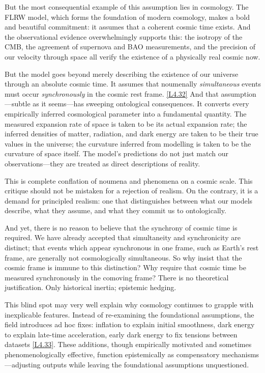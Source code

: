 \documentclass[12pt]{book}
\newcounter{logicanchor}
\newenvironment{logicanchorenv}[1]{\refstepcounter{logicanchor}\label{#1}}{}
\newcommand{\logiclink}[2]{\begin{logicanchorenv}{logic:#1}\end{logicanchorenv}\hyperref[appendix:#1]{[#1]}\xspace}
\begin{document}
But the most consequential example of this assumption lies in cosmology. The FLRW model, which forms the foundation of modern cosmology, makes a bold and beautiful commitment: it assumes that a coherent cosmic time exists. And the observational evidence overwhelmingly supports this: the isotropy of the CMB, the agreement of supernova and BAO measurements, and the precision of our velocity through space all verify the existence of a physically real cosmic now.

But the model goes beyond merely describing the existence of our universe through an absolute cosmic time. It assumes that noumenally \textit{simultaneous} events must occur \textit{synchronously} in the cosmic rest frame. \logiclink{L4.32}{} And that assumption---subtle as it seems---has sweeping ontological consequences. It converts every empirically inferred cosmological parameter into a fundamental quantity. The measured expansion rate of space is taken to be its actual expansion rate; the inferred densities of matter, radiation, and dark energy are taken to be their true values in the universe; the curvature inferred from modelling is taken to be the curvature of space itself. The model's predictions do not just match our observations---they are treated as direct descriptions of reality. 

This is complete conflation of noumena and phenomena on a cosmic scale. This critique should not be mistaken for a rejection of realism. On the contrary, it is a demand for principled realism: one that distinguishes between what our models describe, what they assume, and what they commit us to ontologically.

And yet, there is no reason to believe that the synchrony of cosmic time is required. We have already accepted that simultaneity and synchronicity are distinct; that events which appear synchronous in one frame, such as Earth's rest frame, are generally not cosmologically simultaneous. So why insist that the cosmic frame is immune to this distinction? Why require that cosmic time be measured synchronously in the comoving frame? There is no theoretical justification. Only historical inertia; epistemic hedging.

This blind spot may very well explain why cosmology continues to grapple with inexplicable features. Instead of re-examining the foundational assumptions, the field introduces ad hoc fixes: inflation to explain initial smoothness, dark energy to explain late-time acceleration, early dark energy to fix tensions between datasets \logiclink{L4.33}{}. These additions, though empirically motivated and sometimes phenomenologically effective, function epistemically as compensatory mechanisms---adjusting outputs while leaving the foundational assumptions unquestioned.
\end{document}
